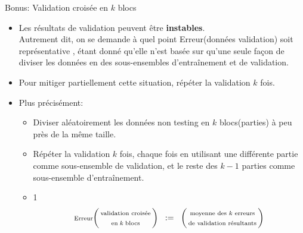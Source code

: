 


\begin{frame}{\Large \vskip -0.2cm Bonus: Validation crois\'ee en $k$ blocs}

\small

\begin{itemize}

\item
	Les r\'esultats de validation peuvent \^etre \textbf{\color{red}instables}.\\
	{\scriptsize Autrement dit, on se demande \`a quel point
	Erreur(donn\'ees validation) soit \guillemotleft\;repr\'esentative \guillemotright,
	\'etant donn\'e qu'elle n'est bas\'ee sur qu'une seule fa\c{c}on de diviser les donn\'ees
	en des sous-ensembles d'entra\^inement et de validation.}

\vskip 0.3cm
\item
	Pour mitiger partiellement cette situation,
	\guillemotleft\;r\'ep\'eter \guillemotright\;la validation $k$ fois.

\vskip 0.3cm
\item
	Plus pr\'ecis\'ement:
	\begin{itemize}
	\item
		Diviser al\'eatoirement les donn\'ees non testing en
		$k$ \guillemotleft\;blocs\;\guillemotright\;(parties)
		\`a peu pr\`es de la m\^eme taille.
	\item
		R\'ep\'eter la validation $k$ fois, chaque fois en utilisant une diff\'erente partie
		comme sous-ensemble de validation, et
		le reste des $k-1$ parties comme sous-ensemble d'entra\^inement.
	\item
		{\color{white}1} \vskip -0.5cm
		\begin{equation*}
		\textnormal{\scriptsize Erreur}\!\left(\!\!\begin{array}{c}
			\textnormal{\scriptsize validation crois\'ee}
			\\
			\textnormal{\scriptsize en\;$k$\;blocs}
			\end{array}\!\!\right)
		\;\; := \;\;
		\left(\!\!\begin{array}{c}
			\textnormal{\scriptsize moyenne des $k$ erreurs}
			\\
			\textnormal{\scriptsize de validation r\'esultants}
			\end{array}\!\!\right)
		\end{equation*}
	\end{itemize}

\end{itemize}

\end{frame}
\normalsize

